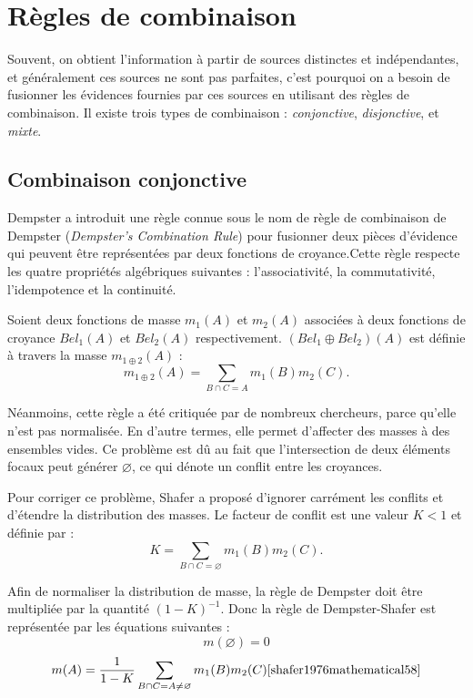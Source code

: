 \section{Règles de combinaison}

Souvent, on obtient l’information à partir de sources distinctes et indépendantes,
et généralement ces sources ne sont pas parfaites, c’est pourquoi on a besoin de
fusionner les évidences fournies par ces sources en utilisant des règles de
combinaison. Il existe trois types de combinaison : \emph{conjonctive},
\emph{disjonctive}, et \emph{mixte}.

\subsection{Combinaison conjonctive}

Dempster a introduit une règle connue sous le nom de règle de combinaison
de Dempster (\emph{Dempster's Combination Rule}) pour fusionner deux pièces
d’évidence qui peuvent être représentées par deux fonctions de croyance.Cette
règle respecte les quatre propriétés algébriques suivantes : l’associativité,
la commutativité, l’idempotence et la continuité.\cite{sentz2002combination16}

Soient deux fonctions de masse $m_1(A)$ et $m_2(A)$ associées à deux fonctions
de croyance $Bel_1(A)$ et $Bel_2(A)$ respectivement. $(Bel_1 \oplus Bel_2)(A)$
est définie à travers la masse $m_{1 \oplus 2}(A)$ :
\begin{equation}
m_{1 \oplus 2}(A) = \sum_{B \cap C = A} m_1(B) m_2(C).
\end{equation}

Néanmoins, cette règle a été critiquée par de nombreux chercheurs, parce qu’elle
n’est pas normalisée. En d’autre termes, elle permet d’affecter des masses à
des ensembles vides. Ce problème est dû au fait que l’intersection de deux
éléments focaux peut générer $\varnothing$, ce qui dénote un conflit entre les croyances.

Pour corriger ce problème, Shafer a proposé d’ignorer carrément les conflits
et d'étendre la distribution des masses. Le facteur de conflit est une valeur
$K < 1$ et définie par :
\begin{equation}
K = \sum_{B \cap C = \varnothing} m_1(B) m_2(C).
\end{equation}

Afin de normaliser la distribution de masse, la règle de Dempster doit être
multipliée par la quantité $(1 - K)^{-1}$. Donc la règle de Dempster-Shafer
est représentée par les équations suivantes :
\begin{equation}
m(\varnothing) = 0
\end{equation}
\begin{equation}
m(A) = \frac{1}{1-K} \sum_{B \cap C = A \neq \varnothing} m_1(B) m_2(C) \cite{shafer1976mathematical58}
\end{equation}

